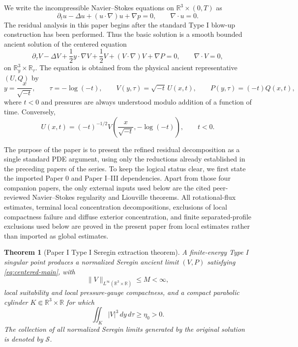 \documentclass[11pt]{amsart}
\numberwithin{equation}{section}
\theoremstyle{plain}
\newtheorem{theorem}{Theorem}[section]
\theoremstyle{definition}
\theoremstyle{remark}
\newcommand{\R}{\mathbb R}
\newcommand{\calS}{\mathcal S}
\begin{document}
We write the incompressible Navier--Stokes equations on
\(\R^3\times(0,T)\) as
\begin{equation}\label{eq:NS-physical}
   \partial_tu-\Delta u+(u\cdot\nabla)u+\nabla p=0,
   \qquad \nabla\cdot u=0 .
\end{equation}
The residual analysis in this paper begins after the standard Type I blow-up
construction has been performed.  Thus the basic solution is a smooth bounded
ancient solution of the centered equation
\begin{equation}\label{eq:centered-main}
   \partial_\tau V-\Delta V+\frac12 y\cdot\nabla V+\frac12 V
   +(V\cdot\nabla)V+\nabla P=0,
   \qquad \nabla\cdot V=0 ,
\end{equation}
on \(\R^3_y\times\R_\tau\).  The equation is obtained from the physical
ancient representative \((U,Q)\) by
\begin{equation}\label{eq:centered-transform}
   y=\frac{x}{\sqrt{-t}},\qquad
   \tau=-\log(-t),\qquad
   V(y,\tau)=\sqrt{-t}\,U(x,t),
   \qquad
   P(y,\tau)=(-t)Q(x,t),
\end{equation}
where \(t<0\) and pressures are always understood modulo addition of a
function of time.  Conversely,
\begin{equation}\label{eq:physical-pullback-main}
   U(x,t)=(-t)^{-1/2}
   V\!\left(\frac{x}{\sqrt{-t}},-\log(-t)\right),
   \qquad t<0 .
\end{equation}

The purpose of the paper is to present the refined residual decomposition as a
single standard PDE argument, using only the reductions already established in
the preceding papers of the series.  To keep the logical status clear, we first state the imported Paper
0 and Paper I--III dependencies.  Apart from those four companion papers, the
only external inputs used below are the cited peer-reviewed Navier--Stokes
regularity and Liouville theorems.  All rotational-flux estimates, terminal
local concentration decompositions, exclusions of local compactness failure and
diffuse exterior concentration, and finite separated-profile exclusions used
below are proved in the present paper from local estimates rather than imported
as global estimates.

\begin{theorem}[Paper I Type I Seregin extraction theorem]
\label{hyp:base-seregin-package}
A finite-energy Type I singular point produces a normalized Seregin ancient
limit \((V,P)\) satisfying \eqref{eq:centered-main}, with
\[
   \|V\|_{L^\infty(\R^3\times\R)}\le M<\infty,
\]
local suitability and local pressure-gauge compactness, and a compact
parabolic cylinder \(K\Subset\R^3\times\R\) for which
\begin{equation}\label{eq:positive-velocity-main}
   \iint_K |V|^3\,dy\,d\tau
   \ge \eta_0>0 .
\end{equation}
The collection of all normalized Seregin limits generated by the original
solution is
denoted by \(\calS\).
\end{theorem}
\end{document}
